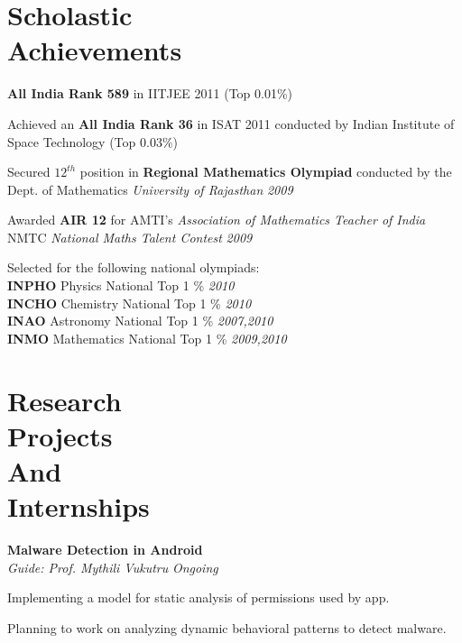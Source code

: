 \documentclass[margin,11pt]{resume}
\begin{document}
\begin{resume}

\vspace{25mm}

\section{\mysidestyle Scholastic\\Achievements}

\begin{list2}
\item \textbf{All India Rank 589} in IITJEE 2011 (Top 0.01\%)
\item Achieved an \textbf{All India Rank 36} in ISAT 2011 conducted by Indian Institute of Space Technology (Top 0.03\%)
\item Secured $12^{th}$ position in \textbf{Regional Mathematics Olympiad} conducted by the Dept. of Mathematics \emph{University of Rajasthan} \hfill \emph{2009}
\item Awarded \textbf{AIR 12} for AMTI's \emph{Association of Mathematics Teacher of India} NMTC \emph{National Maths Talent Contest} \hfill \emph{2009}
\item Selected for the following national olympiads: \\
 \textbf{  INPHO} Physics National Top 1 \% \hfill \emph{2010} \\
 \textbf{  INCHO} Chemistry National Top 1 \% \hfill \emph{2010} \\
 \textbf{  INAO} Astronomy National Top 1 \% \hfill \emph{2007,2010} \\
 \textbf{  INMO} Mathematics National Top 1 \% \hfill \emph{2009,2010} \\
\end{list2}
\section{\mysidestyle Research\\Projects\\And\\Internships }

\textbf{Malware Detection in Android} \\
	\textsl{Guide: Prof. Mythili Vukutru} \hfill \emph{Ongoing}
\begin{list2}
\item Implementing a model for static analysis of permissions used by app. 
\item Planning to work on analyzing dynamic behavioral patterns to detect malware.
\end{list2}


\end{resume}
\end{document}

